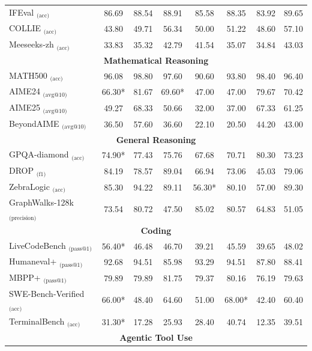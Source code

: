 \begin{table}[htbp]
{\begin{tabular}{l|ccc|ccc|c}
 \midrule 
         IFEval $_{\text{(acc)}}$ & 86.69 & 88.54 & 88.91 & 85.58 & 88.35 & 83.92 & 89.65 \\ 
         COLLIE $_{\text{(acc)}}$ & 43.80 & 49.71 & 56.34 & 50.00 & 51.22 & 48.60 & 57.10 \\ 
         Meeseeks-zh $_{\text{(acc)}}$ & 33.83 & 35.32 & 42.79 & 41.54 & 35.07 & 34.84 & 43.03 \\ 
         \midrule 
       
  \multicolumn{8}{c}{\textbf{Mathematical Reasoning}} \\ 
         \midrule 
         MATH500 $_{\text{(acc)}}$  & 96.08 & 98.80 & 97.60 & 90.60 & 93.80 & 98.40 & 96.40 \\ 
         AIME24 $_{\text{(avg@10)}}$  & 66.30* & 81.67 & 69.60* & 47.00 & 47.00 & 79.67 &  70.42 \\ 
         AIME25 $_{\text{(avg@10)}}$  & 49.27 & 68.33 & 50.66 & 32.00 & 37.00 & 67.33 & 61.25 \\ 
    
     BeyondAIME $_{\text{(avg@10)}}$ & 36.50 & 57.60 & 36.60 & 22.10 & 20.50 & 44.20 & 43.00 \\ 
         \midrule 
         \multicolumn{8}{c}{\textbf{General Reasoning}} \\ 
         \midrule 
         GPQA-diamond $_{\text{(acc)}}$ & 74.90* & 77.43 & 75.76 & 67.68 & 70.71 & 80.30 & 73.23 \\ 
         DROP $_{\text{(f1)}}$  & 84.19 & 78.57 & 89.04 & 66.94 & 73.06 & 45.03 & 79.06 \\ 
         ZebraLogic $_{\text{(acc)}}$  & 85.30 & 94.22 & 89.11 & 56.30* & 80.10 & 57.00 & 89.30 \\ 
         GraphWalks-128k $_{\text{(precision)}}$  & 73.54 & 80.72 & 47.50 & 85.02 & 80.57 & 64.83 & 51.05 \\ 
         \midrule 
         \multicolumn{8}{c}{\textbf{Coding}} \\ 
         \midrule 
   
         LiveCodeBench $_{\text{(pass@1)}}$ & 56.40*  & 46.48 & 46.70 & 39.21 & 45.59 & 39.65 & 48.02 \\ 
      Humaneval+ $_{\text{(pass@1)}}$  & 92.68 & 94.51 & 85.98 & 93.29 & 94.51 & 87.80 & 88.41 \\ 
         MBPP+ $_{\text{(pass@1)}}$  & 79.89 & 79.89 & 81.75 & 79.37 & 80.16 & 76.19 & 79.63 \\ 
         SWE-Bench-Verified $_{\text{(acc)}}$  & 66.00* & 48.40 & 64.60 & 51.00 & 68.00* & 42.40 & 60.40 \\ 
         TerminalBench $_{\text{(acc)}}$ & 31.30* & 17.28 & 25.93 & 28.40 & 40.74 & 12.35 & 39.51 \\ 
         \midrule 
         \multicolumn{8}{c}{\textbf{Agentic Tool Use}} \\ 
         \midrule 
         

\end{tabular}}
\end{table}
